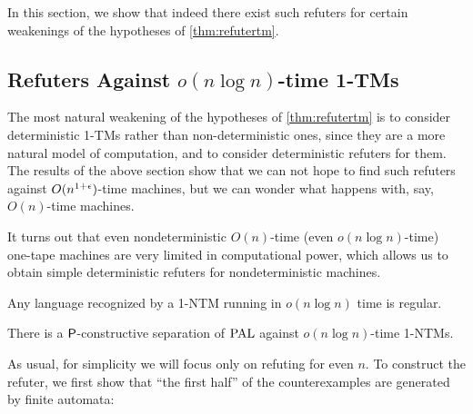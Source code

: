 In this section, we show that indeed there exist such refuters for certain weakenings of the hypotheses of \cref{thm:refutertm}.

\subsection{Refuters Against $o(n \log n)$-time 1-TMs}

The most natural weakening of the hypotheses of \cref{thm:refutertm} is to consider deterministic 1-TMs rather than non-deterministic ones,
since they are a more natural model of computation, and to consider deterministic refuters for them. The results of the above 
section show that we can not hope to find such refuters against $O(n^{1+\epsilon})$-time machines, but we can wonder what happens with, say,
$O(n)$-time machines. 

It turns out that even nondeterministic $O(n)$-time (even $o(n \log n)$-time) one-tape machines are very limited in computational power,
which allows us to obtain simple deterministic refuters for nondeterministic machines. 

\begin{theorem}
Any language recognized by a 1-NTM running in $o(n \log n)$ time is regular.
\end{theorem}

\begin{theorem}
\label{thm:regularrefuter}
There is a $\mathsf{P}$-constructive separation of $\mathrm{PAL}$ against $o(n \log n)$-time 1-NTMs. 
\end{theorem}

As usual, for simplicity we will focus only on refuting for even $n$. To construct the refuter, we first show that
``the first half'' of the counterexamples are generated by finite automata:


